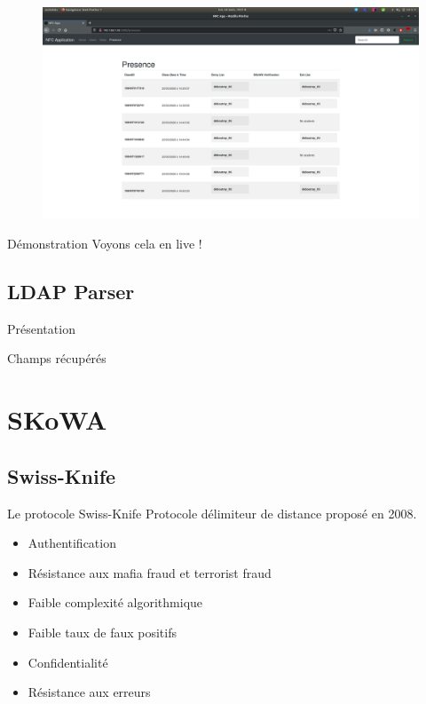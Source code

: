 \documentclass[aspectratio=169]{beamer}
\begin{document}
\begin{frame}
  \begin{figure}
    \centering
    \includegraphics[height=.9\textheight]{../assets/capture_page_presence.png}
  \end{figure}
\end{frame}

\begin{frame}{Démonstration}
  Voyons cela en live !
\end{frame}

\subsection{LDAP Parser}

\begin{frame}{Présentation}

\end{frame}

\begin{frame}{Champs récupérés}

\end{frame}

\section{SKoWA}

\subsection{Swiss-Knife}

\begin{frame}{Le protocole Swiss-Knife}
  Protocole délimiteur de distance proposé en 2008. \cite{SwissKnife}

  \bigskip

  \begin{itemize}
    \item Authentification
    \item Résistance aux mafia fraud et terrorist fraud
    \item Faible complexité algorithmique
    \item Faible taux de faux positifs
    \item Confidentialité
    \item Résistance aux erreurs
  \end{itemize}
\end{frame}
\end{document}
